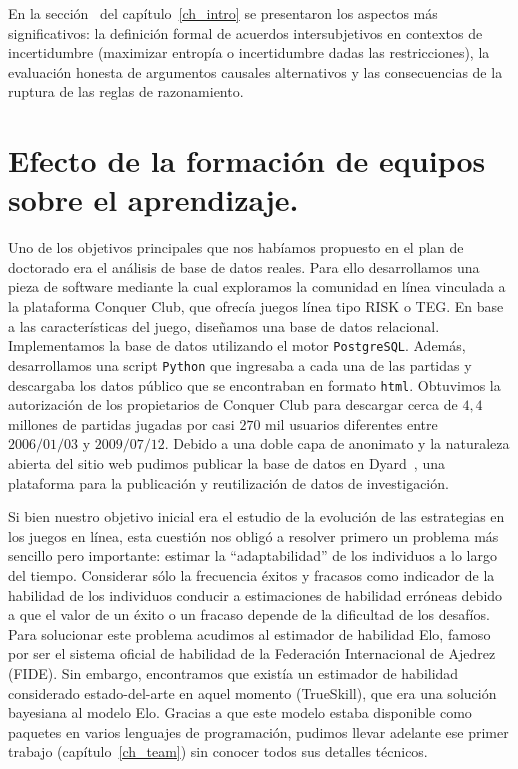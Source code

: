 \documentclass[a4paper,11pt]{book}
\theoremstyle{definition}
\begin{document}

En la secci\'on~\emph{} del cap\'itulo~\ref{ch_intro} se presentaron los aspectos m\'as significativos: la definici\'on formal de acuerdos intersubjetivos en contextos de incertidumbre (maximizar entrop\'ia o incertidumbre dadas las restricciones), la evaluaci\'on honesta de argumentos causales alternativos y las consecuencias de la ruptura de las reglas de razonamiento.


\section{Efecto de la formaci\'on de equipos sobre el aprendizaje.}

Uno de los objetivos principales que nos hab\'iamos propuesto en el plan de doctorado era el an\'alisis de base de datos reales.
%
Para ello desarrollamos una pieza de software mediante la cual exploramos la comunidad en l\'inea vinculada a la plataforma Conquer Club, que ofrec\'ia juegos l\'inea tipo RISK o TEG.
%
En base a las caracter\'isticas del juego, dise\~namos una base de datos relacional.
%
Implementamos la base de datos utilizando el motor \texttt{PostgreSQL}.
%
Adem\'as, desarrollamos una script \texttt{Python} que ingresaba a cada una de las partidas y descargaba los datos p\'ublico que se encontraban en formato \texttt{html}.
%
Obtuvimos la autorizaci\'on de los propietarios de Conquer Club para descargar cerca de $4,4$ millones de partidas jugadas por casi $270$ mil usuarios diferentes entre $2006/01/03$ y $2009/07/12$.
%
Debido a una doble capa de anonimato y la naturaleza abierta del sitio web pudimos publicar la base de datos en Dyard~\cite{landfried2019-conquerClub}, una plataforma para la publicaci\'on y reutilizaci\'on de datos de investigaci\'on.


Si bien nuestro objetivo inicial era el estudio de la evoluci\'on de las estrategias en los juegos en l\'inea, esta cuesti\'on nos oblig\'o a resolver primero un problema m\'as sencillo pero importante: estimar la ``adaptabilidad'' de los individuos a lo largo del tiempo.
%
Considerar s\'olo la frecuencia \'exitos y fracasos como indicador de la habilidad de los individuos conducir a estimaciones de habilidad err\'oneas debido a que el valor de un \'exito o un fracaso depende de la dificultad de los desaf\'ios.
%
Para solucionar este problema acudimos al estimador de habilidad Elo, famoso por ser el sistema oficial de habilidad de la Federaci\'on Internacional de Ajedrez (FIDE).
%
Sin embargo, encontramos que exist\'ia un estimador de habilidad considerado estado-del-arte en aquel momento (TrueSkill), que era una soluci\'on bayesiana al modelo Elo.
%
Gracias a que este modelo estaba disponible como paquetes en varios lenguajes de programaci\'on, pudimos llevar adelante ese primer trabajo (cap\'itulo~\ref{ch_team}) sin conocer todos sus detalles t\'ecnicos.
\end{document}
